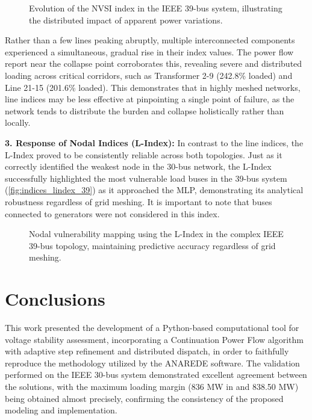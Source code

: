 \documentclass{ieeeaccess}
\begin{document}
\begin{figure}[htbp]
    \centering
    
    \caption{Evolution of the NVSI index in the IEEE 39-bus system, illustrating the distributed impact of apparent power variations.}
    \label{fig:indices_nvsi_39}
\end{figure}

Rather than a few lines peaking abruptly, multiple interconnected components experienced a simultaneous, gradual rise in their index values. The power flow report near the collapse point corroborates this, revealing severe and distributed loading across critical corridors, such as Transformer 2-9 (242.8\% loaded) and Line 21-15 (201.6\% loaded). This demonstrates that in highly meshed networks, line indices may be less effective at pinpointing a single point of failure, as the network tends to distribute the burden and collapse holistically rather than locally.

\textbf{3. Response of Nodal Indices (L-Index):}
In contrast to the line indices, the L-Index proved to be consistently reliable across both topologies. Just as it correctly identified the weakest node in the 30-bus network, the L-Index successfully highlighted the most vulnerable load buses in the 39-bus system (\autoref{fig:indices_lindex_39}) as it approached the MLP, demonstrating its analytical robustness regardless of grid meshing. It is important to note that buses connected to generators were not considered in this index.

\begin{figure}[htbp]
    \centering
    
    \caption{Nodal vulnerability mapping using the L-Index in the complex IEEE 39-bus topology, maintaining predictive accuracy regardless of grid meshing.}
    \label{fig:indices_lindex_39}
\end{figure}

\section{Conclusions}
\label{sec:conclusions}

This work presented the development of a Python-based computational tool for voltage stability assessment, incorporating a Continuation Power Flow algorithm with adaptive step refinement and distributed dispatch, in order to faithfully reproduce the methodology utilized by the ANAREDE software. The validation performed on the IEEE 30-bus system demonstrated excellent agreement between the solutions, with the maximum loading margin (836 MW in \cite{madureira2023avaliacao} and 838.50 MW) being obtained almost precisely, confirming the consistency of the proposed modeling and implementation.
\end{document}
